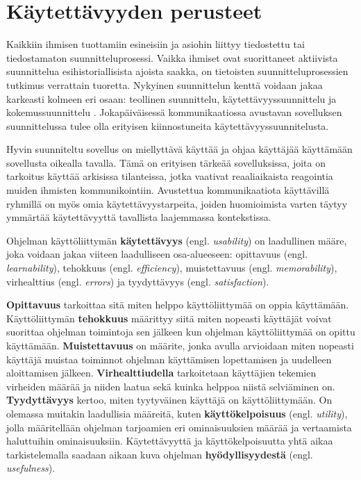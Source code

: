\documentclass[utf8]{gradu3}
\begin{document}
\section{Käytettävyyden perusteet}

Kaikkiin ihmisen tuottamiin esineisiin ja asiohin liittyy tiedostettu tai tiedostamaton suunnitteluprosessi. Vaikka ihmiset ovat suorittaneet aktiivista suunnittelua esihistoriallisista ajoista saakka, on tietoisten suunnitteluprosessien tutkimus verrattain tuoretta. Nykyinen suunnittelun kenttä voidaan jakaa karkeasti kolmeen eri osaan: teollinen suunnittelu, käytettävyyssuunnittelu ja kokemussuunnittelu \parencite[]{norman-doet}. Jokapäiväisessä kommunikaatiossa avustavan sovelluksen suunnittelussa tulee olla erityisen kiinnostuneita käytettävyyssuunnitelusta.

Hyvin suunniteltu sovellus on miellyttävä käyttää ja ohjaa käyttäjää käyttämään sovellusta oikealla tavalla. Tämä on erityisen tärkeää sovelluksissa, joita on tarkoitus käyttää arkisissa tilanteissa, jotka vaativat reaaliaikaista reagointia muiden ihmisten kommunikointiin. Avustettua kommunikaatiota käyttävillä ryhmillä on myös omia käytettävyystarpeita, joiden huomioimista varten täytyy ymmärtää käytettävyyttä tavallista laajemmassa kontekstissa.

\label{general-usability-requirements}
Ohjelman käyttöliittymän \textbf{käytettävyys} (engl. \textit{usability}) on laadullinen määre, joka voidaan jakaa viiteen laadulliseen osa-alueeseen: opittavuus (engl. \textit{learnability}), tehokkuus (engl. \textit{efficiency}), muistettavuus (engl. \textit{memorability}), virhealttius (engl. \textit{errors}) ja tyydyttävyys (engl. \textit{satisfaction}). 

\textbf{Opittavuus} tarkoittaa sitä miten helppo käyttöliittymää on oppia käyttämään. Käyttöliittymän \textbf{tehokkuus} määrittyy siitä miten nopeasti käyttäjät voivat suorittaa ohjelman toimintoja sen jälkeen kun ohjelman käyttöliittymää on opittu käyttämään. \textbf{Muistettavuus} on määrite, jonka avulla arvioidaan miten nopeasti käyttäjä muistaa toiminnot ohjelman käyttämisen lopettamisen ja uudelleen aloittamisen jälkeen. \textbf{Virhealttiudella} tarkoitetaan käyttäjien tekemien virheiden määrää ja niiden laatua sekä kuinka helppoa niistä selviäminen on. \textbf{Tyydyttävyys} kertoo, miten tyytyväinen käyttäjä on käyttöliittymään. On olemassa muitakin laadullisia määreitä, kuten \textbf{käyttökelpoisuus} (engl. \textit{utility}), jolla määritellään ohjelman tarjoamien eri ominaisuuksien määrää ja vertaamista haluttuihin ominaisuuksiin. Käytettävyyttä ja käyttökelpoisuutta yhtä aikaa tarkistelemalla saadaan aikaan kuva ohjelman \textbf{hyödyllisyydestä} (engl. \textit{usefulness}). \parencite[]{usability-101}
\end{document}
